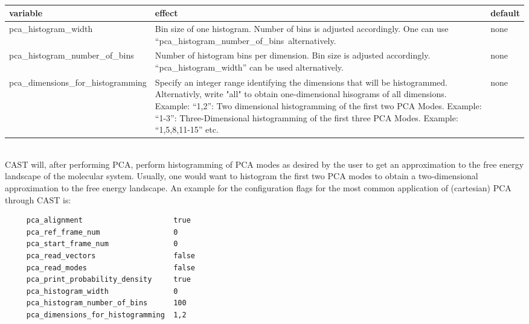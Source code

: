 \documentclass[10pt,a4paper]{article} %
\begin{document}
		~\\
		\begin{longtable}{|p{5.1cm}|p{5cm}|p{1cm}|}
		variable & effect & default\\
		\hline
		pca\_histogram\_width & Bin size of one histogram. Number of bins is adjusted accordingly. One can use ``pca\_histogram\_number\_of\_bins\ alternatively. & none\\
		pca\_histogram\_number\_of\_bins & Number of histogram bins per dimension. Bin size is adjusted accordingly. ``pca\_histogram\_width'' can be used alternatively. & none\\
		pca\_dimensions\_for\_histogramming & Specify an integer range identifying the dimensions that will be histogrammed. Alternativly, write "all" to obtain one-dimensional hisograms of all dimensions. Example: ``1,2'': Two dimensional histogramming of the first two \ac{PCA} Modes. Example: ``1-3'': Three-Dimensional histogramming of the first three \ac{PCA} Modes. Example: ``1,5,8,11-15'' etc.& none\\
		
	\end{longtable}~\\
		
	 \ac{CAST} will, after performing \ac{PCA}, perform histogramming of \ac{PCA} modes as desired by the user to get an approximation to the free energy landscape of the molecular system. Usually, one would want to histogram the first two \ac{PCA} modes to obtain a two-dimensional approximation to the free energy landscape. An example for the configuration flags for the most common application of (cartesian) \ac{PCA} through \ac{CAST} is:\\
	 
	 \begin{lstlisting}
	 pca_alignment                     true
	 pca_ref_frame_num                 0
	 pca_start_frame_num               0
	 pca_read_vectors                  false
	 pca_read_modes                    false
	 pca_print_probability_density     true
	 pca_histogram_width               0
	 pca_histogram_number_of_bins      100
	 pca_dimensions_for_histogramming  1,2\end{lstlisting}
	 
\end{document}
